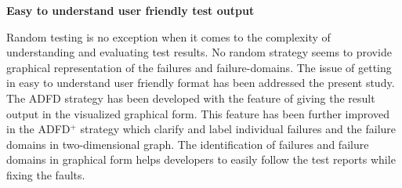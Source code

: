\textbf{Easy to understand user friendly test output}

Random testing is no exception when it comes to the complexity of understanding and evaluating test results. No random strategy seems to provide graphical representation of the failures and failure-domains. The issue of getting in easy to understand user friendly format has been addressed the present study. The ADFD strategy has been developed with the feature of giving the result output in the visualized graphical form. This feature has been further improved in the ADFD$^+$ strategy which clarify and label individual failures and the failure domains in two-dimensional graph. The identification of failures and failure domains in graphical form helps developers to easily follow the test reports while fixing the faults.  \\




